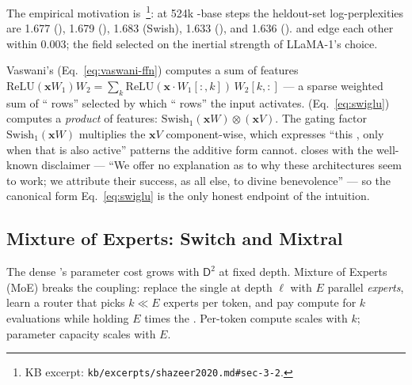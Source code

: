 The empirical motivation is~\citet[\S 3.2,
Tab.~1]{shazeer2020}\footnote{KB excerpt:
\texttt{kb/excerpts/shazeer2020.md\#sec-3-2}.}: at 524k -base steps
the heldout-set log-perplexities are 1.677 (), 1.679 (), 1.683
(Swish), 1.633 (), and 1.636 ().  and  edge each
other within $0.003$; the field selected  on the inertial
strength of LLaMA-1's choice.

\begin{intuition}
Vaswani's  (Eq.~\eqref{eq:vaswani-ffn}) computes a sum of features
$\mathrm{ReLU}(\mathbf{x} W_1) W_2 = \sum_k \mathrm{ReLU}(\mathbf{x}\!\cdot\!W_1[:,k])\,W_2[k,:]$
--- a sparse weighted sum of `` rows'' selected by which
`` rows'' the input activates. 
(Eq.~\eqref{eq:swiglu}) computes a \emph{product} of features:
$\mathrm{Swish}_1(\mathbf{x} W) \otimes (\mathbf{x} V)$. The gating
factor $\mathrm{Swish}_1(\mathbf{x} W)$ multiplies the 
$\mathbf{x} V$ component-wise, which expresses ``this , only
when that  is also active'' patterns the additive form cannot.
\citet[\S 4]{shazeer2020} closes with the well-known disclaimer ---
``We offer no explanation as to why these architectures seem to
work; we attribute their success, as all else, to divine benevolence''
--- so the canonical form Eq.~\eqref{eq:swiglu} is the only honest
endpoint of the intuition.
\end{intuition}

\subsection{Mixture of Experts: Switch and Mixtral}
\label{sec:ffn-moe-coarse}

The dense 's parameter cost grows with $\mathsf{D}^2$ at fixed
depth. Mixture of Experts (MoE) breaks the coupling: replace the
single  at depth $\ell$ with $E$ parallel 
\emph{experts}, learn a router that picks $k \ll E$ experts per
token, and pay compute for $k$  evaluations while holding $E$
times the . Per-token compute scales with $k$;
parameter capacity scales with $E$.

